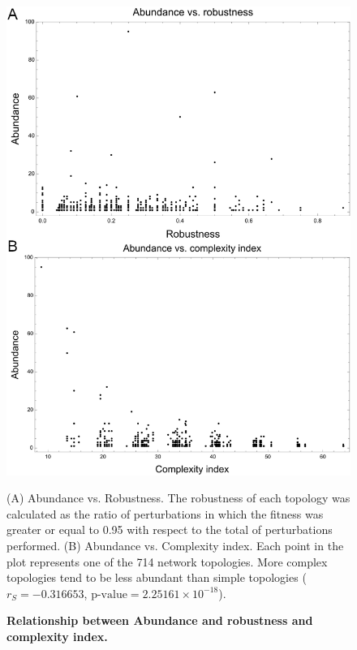\documentclass[10pt,letterpaper]{article}
\begin{document}
\begin{figure}[!h]
 \includegraphics[width=\textwidth]{figures/results/Fig6}
 \caption{\bf Relationship between Abundance and robustness and complexity
 index.} (A) Abundance vs. Robustness. The robustness of each topology was
 calculated as the ratio of perturbations in which the fitness was greater or
 equal to 0.95 with respect to the total of perturbations performed.
 (B) Abundance vs. Complexity index. Each point in the plot represents one of
 the 714 network topologies. More complex topologies tend to be less abundant
 than simple topologies
 ($r_S = -0.316653$, $\text{p-value} = 2.25161\times10^{-18}$).
 \label{fig:ab-rob}
\end{figure}
\end{document}
